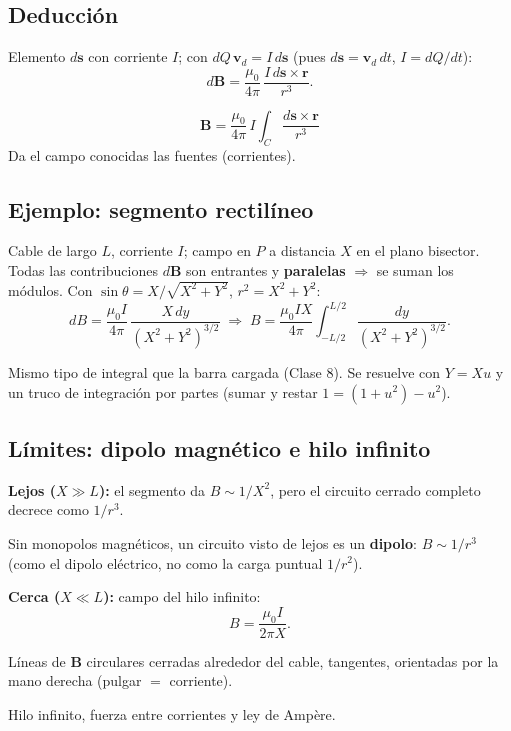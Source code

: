 \documentclass[12pt,a4paper]{article}
\begin{document}
\subsection{Deducción}

Elemento $d\mathbf{s}$ con corriente $I$; con $dQ\,\mathbf{v}_d = I\,d\mathbf{s}$
(pues $d\mathbf{s} = \mathbf{v}_d\,dt$, $I = dQ/dt$):
\[
d\mathbf{B} = \frac{\mu_0}{4\pi}\,\frac{I\,d\mathbf{s}\times\mathbf{r}}{r^3}.
\]

\begin{keybox}
  \[
  \boxed{\mathbf{B} = \frac{\mu_0}{4\pi}\,I\int_C
         \frac{d\mathbf{s}\times\mathbf{r}}{r^3}}
  \]
  Da el campo conocidas las fuentes (corrientes).
\end{keybox}

\subsection{Ejemplo: segmento rectilíneo}

Cable de largo $L$, corriente $I$; campo en $P$ a distancia $X$ en el
plano bisector. Todas las contribuciones $d\mathbf{B}$ son entrantes y
\textbf{paralelas} $\Rightarrow$ se suman los módulos. Con $\sin\theta =
X/\sqrt{X^2+Y^2}$, $r^2 = X^2+Y^2$:
\[
dB = \frac{\mu_0 I}{4\pi}\,\frac{X\,dy}{(X^2+Y^2)^{3/2}}
\;\Longrightarrow\;
B = \frac{\mu_0 I X}{4\pi}\int_{-L/2}^{L/2}\frac{dy}{(X^2+Y^2)^{3/2}}.
\]



\begin{notebox}[Cálculo]
  Mismo tipo de integral que la barra cargada (Clase 8). Se resuelve con
  $Y = Xu$ y un truco de integración por partes (sumar y restar
  $1 = (1+u^2) - u^2$).
\end{notebox}

\subsection{Límites: dipolo magnético e hilo infinito}

\textbf{Lejos ($X \gg L$):} el segmento da $B\sim 1/X^2$, pero el circuito
cerrado completo decrece como $1/r^3$.

\begin{keybox}
  Sin monopolos magnéticos, un circuito visto de lejos es un
  \textbf{dipolo}: $B \sim 1/r^3$ (como el dipolo eléctrico, no como la
  carga puntual $1/r^2$).
\end{keybox}

\textbf{Cerca ($X \ll L$):} campo del hilo infinito:
\[
\boxed{B = \frac{\mu_0 I}{2\pi X}}.
\]



\begin{notebox}[Dirección]
  Líneas de $\mathbf{B}$ circulares cerradas alrededor del cable,
  tangentes, orientadas por la mano derecha (pulgar $=$ corriente).
\end{notebox}

\begin{notebox}
  Hilo infinito, fuerza entre corrientes y ley de Ampère.
\end{notebox}
\end{document}

